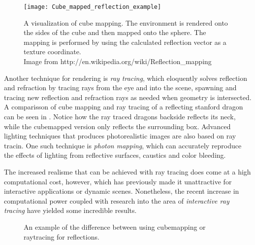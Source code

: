\begin{figure}
  \centering
  \texttt{[image: Cube\_mapped\_reflection\_example]}
  
  \vspace{3mm}
  \parbox{9.5cm}{\caption[Cube mapping visualized.]{A visualization of
      cube mapping. The environment is rendered onto the sides of the
      cube and then mapped onto the sphere. The mapping is performed
      by using the calculated reflection vector as a texture
      coordinate.\\Image from
      http://en.wikipedia.org/wiki/Reflection\_mapping}\label{fig:cubemap}}
\end{figure}


Another technique for rendering is \textit{ray tracing}, which
eloquently solves reflection and refraction by tracing rays from the
eye and into the scene, spawning and tracing new reflection and
refraction rays as needed when geometry is intersected. A comparisson
of cube mapping and ray tracing of a reflecting stanford dragon can be
seen in . Notice how the ray traced
dragons backside reflects its neck, while the cubemapped version only
reflects the surrounding box. Advanced lighting techniques that
produces photorealistic images are also based on ray tracin. One such
technique is \textit{photon mapping}, which can accurately reproduce
the effects of lighting from reflective surfaces, caustics and color
bleeding.



The increased realisme that can be achieved with ray tracing does come
at a high computational cost, however, which has previously made it
unattractive for interactive applications or dynamic
scenes. Nonetheless, the recent increase in computational power
coupled with research into the area of \textit{interactive ray
  tracing} have yielded some incredible results.

\begin{figure}
  \centering
  \hspace{10pt}
  \caption[Cubemapping vs raytracing for reflections.]{An example of
    the difference between using cubemapping or raytracing for
    reflections.}
  \label{fig:reflectingDragons}
\end{figure}


